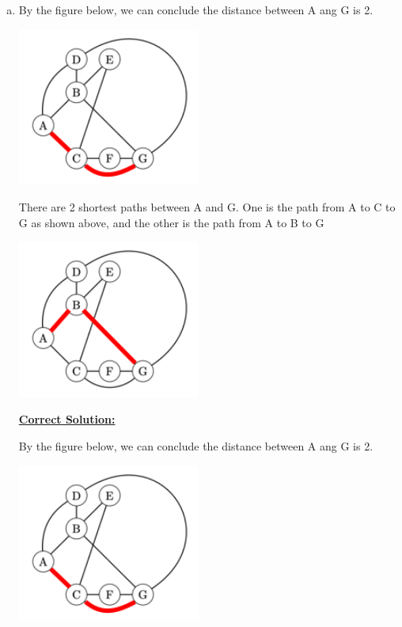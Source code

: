 \documentclass[12pt]{article}
\begin{document}
\begin{enumerate}[a.]
    \item
    By the figure below, we can conclude the distance between A ang G is 2.

    \begin{center}
    \includegraphics[width=6cm]{images/worksheet_19_q1d_solution.png}
    \end{center}

    \bigskip

    There are 2 shortest paths between A and G. One is the path from A to C to G as
    shown above, and the other is the path from A to B to G

    \begin{center}
    \includegraphics[width=6cm]{images/worksheet_19_q1d2_solution.png}
    \end{center}

    \begin{mdframed}
        \underline{\textbf{Correct Solution:}}

        By the figure below, we can conclude the distance between A ang G is 2.

        \begin{center}
        \includegraphics[width=6cm]{images/worksheet_19_q1d_solution.png}
        \end{center}


\end{mdframed}
\end{enumerate}
\end{document}
